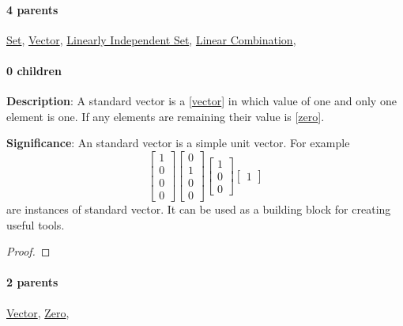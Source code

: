 \documentclass[../main.tex]{subfiles}
\begin{document}
\paragraph{4 parents} \hyperref[statement:Set]{Set}, \hyperref[statement:Vector]{Vector}, \hyperref[statement:Linearly Independent Set]{Linearly Independent Set}, \hyperref[statement:Linear Combination]{Linear Combination}, 
\paragraph{0 children} 



\begin{statement}
\label{statement:Standard Vector}\hspace*{0pt}\par
\end{statement}
\textbf{Description}:
A standard vector is a [\hyperref[statement:Vector]{vector}] in which value of one and only one element is one. If any elements are remaining their value is [\hyperref[statement:Zero]{zero}].
\par
{\color{magenta} \textbf{Significance}:
An standard vector is a simple unit vector.
For example
\[
  \begin{bmatrix} 1 \\ 0 \\ 0 \\ 0 \end{bmatrix}
  \begin{bmatrix} 0 \\ 1 \\ 0 \\ 0 \end{bmatrix}
  \begin{bmatrix} 1 \\ 0 \\ 0 \end{bmatrix}
  \begin{bmatrix} 1 \end{bmatrix}
\]
are instances of standard vector.
It can be used as a building block for creating useful tools.
\par}
\begin{proof}
\proofbydefinition
\end{proof}\par
\paragraph{2 parents} \hyperref[statement:Vector]{Vector}, \hyperref[statement:Zero]{Zero}, 
\end{document}

